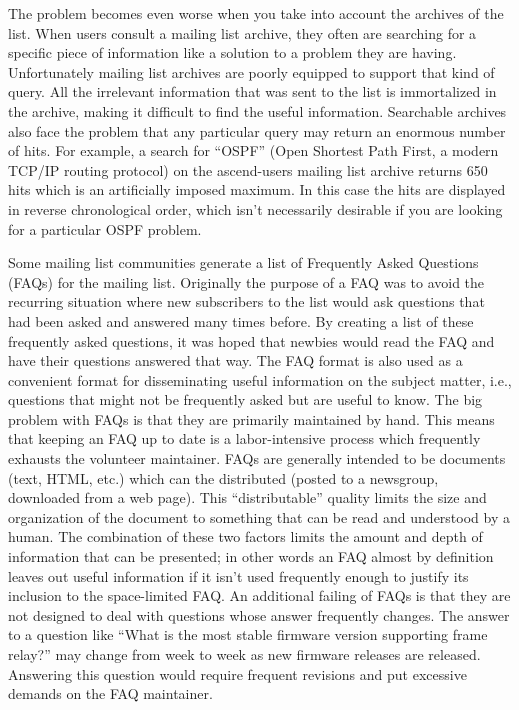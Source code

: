 The problem becomes even worse when you take into account the archives of the
list. When users consult a mailing list archive, they often are searching for
a specific piece of information like a solution to a problem they are having.
Unfortunately mailing list archives are poorly equipped to support that kind of
query. All the irrelevant information that was sent to the list is immortalized
in the archive, making it difficult to find the useful information. Searchable
archives also face the problem that any particular query may return an enormous
number of hits. For example, a search for ``OSPF'' (Open Shortest Path First, a
modern TCP/IP routing protocol) on the ascend-users mailing list archive
\cite{nexial-ascend-website} returns 650 hits which is an artificially imposed
maximum. In this case the hits are displayed in reverse chronological order,
which isn't necessarily desirable if you are looking for a particular OSPF
problem.

Some mailing list communities generate a list of Frequently Asked Questions
(FAQs) for the mailing list. Originally the purpose of a FAQ was to avoid the
recurring situation where new subscribers to the list would ask questions that
had been asked and answered many times before. By creating a list of these
frequently asked questions, it was hoped that newbies would read the FAQ and
have their questions answered that way. The FAQ format is also used as a
convenient format for disseminating useful information on the subject matter,
i.e., questions that might not be frequently asked but are useful to know. The
big problem with FAQs is that they are primarily maintained by hand. This means
that keeping an FAQ up to date is a labor-intensive process which frequently
exhausts the volunteer maintainer. FAQs are generally intended to be documents
(text, HTML, etc.) which can the distributed (posted to a newsgroup, downloaded
from a web page). This ``distributable'' quality limits the size and
organization of the document to something that can be read and understood by a
human. The combination of these two factors limits the amount and depth of
information that can be presented; in other words an FAQ almost by definition
leaves out useful information if it isn't used frequently enough to justify its
inclusion to the space-limited FAQ. An additional failing of FAQs is that they
are not designed to deal with questions whose answer frequently changes. The
answer to a question like ``What is the most stable firmware version supporting
frame relay?'' may change from week to week as new firmware releases are
released. Answering this question would require frequent revisions and put
excessive demands on the FAQ maintainer.


